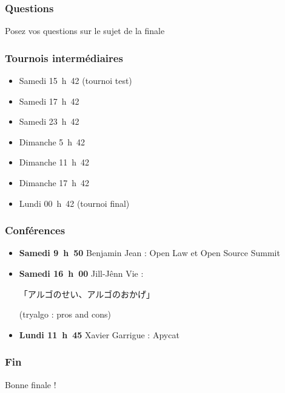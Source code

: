 \documentclass{beamer}
\begin{document}
\begin{frame}
    \frametitle{Questions}
    Posez vos questions sur le sujet de la finale
\end{frame}

\begin{frame}
    \frametitle{Tournois intermédiaires}
    \begin{itemize}
        \item Samedi 15~h~42 (tournoi test)
        \item Samedi 17~h~42
        \item Samedi 23~h~42
        \item Dimanche 5~h~42
        \item Dimanche 11~h~42
        \item Dimanche 17~h~42
        \item Lundi 00~h~42 (tournoi final)
    \end{itemize}
\end{frame}

\begin{frame}
    \frametitle{Conférences}
    \begin{itemize}
        \item \textbf{Samedi 9~h~50} Benjamin Jean : Open Law et Open Source Summit
        \item \textbf{Samedi 16~h~00} Jill-Jênn Vie : \begin{CJK}{UTF8}{min}「アルゴのせい、アルゴのおかげ」\end{CJK} (tryalgo : pros and cons)
        \item \textbf{Lundi 11~h~45} Xavier Garrigue : Apycat
    \end{itemize}
\end{frame}

\begin{frame}
    \frametitle{Fin}
    Bonne finale !
\end{frame}
\end{document}
